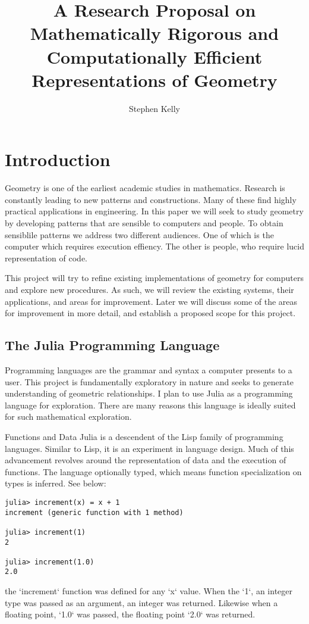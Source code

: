 \documentclass[a4paper]{article}
\title{A Research Proposal on Mathematically Rigorous and Computationally
Efficient Representations of Geometry}
\author{Stephen Kelly}
\begin{document}
\maketitle


\section{Introduction}

Geometry is one of the earliest academic studies in mathematics. Research is
constantly leading to new patterns and constructions. Many of these find
highly practical applications in engineering. In this paper we will seek to
study geometry by developing patterns that are sensible to computers and people.
To obtain sensiblile patterns we address two different audiences. One of
which is the computer which requires execution effiency. The other is people,
who require lucid representation of code.

This project will try to refine existing implementations of geometry for
computers and explore new procedures. As such, we will review the existing
systems, their applications, and areas for improvement. Later we will discuss
some of the areas for improvement in more detail, and establish a proposed
scope for this project.


\subsection{The Julia Programming Language}

Programming languages are the grammar and syntax a computer presents to a user.
This project is fundamentally exploratory in nature and seeks to generate
understanding of geometric relationships. I plan to use Julia as a programming
language for exploration. There are many reasons this language is ideally
suited for such mathematical exploration.

 Functions and Data
Julia is a descendent of the Lisp family of programming languages. Similar
to Lisp, it is an experiment in language design. Much of this advancement
revolves around the representation of data and the execution of functions.
The language optionally typed, which means function specialization on types
is inferred. See below:
\begin{lstlisting}
julia> increment(x) = x + 1
increment (generic function with 1 method)

julia> increment(1)
2

julia> increment(1.0)
2.0
\end{lstlisting}
the `increment` function was defined for any `x` value. When the `1`, an
integer type was passed as an argument, an integer was returned. Likewise
when a floating point, `1.0` was passed, the floating point `2.0` was returned.
\end{document}
